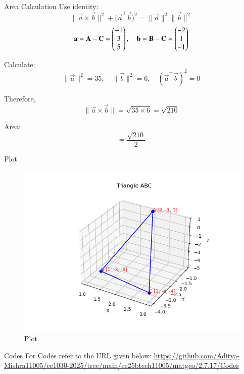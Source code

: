 \documentclass{beamer}
\begin{document}
\begin{frame}{Area Calculation}
Use identity:
\[
\| \vec{a} \times \vec{b} \|^2 + \big( \vec{a}^\top \vec{b} \big)^2 = \|\vec{a}\|^2 \|\vec{b}\|^2
\]
\[
\mathbf{a} = \mathbf{A} - \mathbf{C} = \begin{pmatrix}-1 \\ 3 \\ 5\end{pmatrix}, \quad \mathbf{b} = \mathbf{B} - \mathbf{C} = \begin{pmatrix}-2 \\ 1 \\ -1\end{pmatrix}
\]

Calculate:
\[
\|\vec{a}\|^2 = 35, \quad \|\vec{b}\|^2 = 6, \quad (\vec{a}^\top \vec{b})^2 = 0
\]

Therefore,
\[
\| \vec{a} \times \vec{b} \| = \sqrt{35 \times 6} = \sqrt{210}
\]

Area:
\[
= \frac{\sqrt{210}}{2}
\]
\end{frame}
\begin{frame}{Plot}
\begin{figure}
    \centering
    \includegraphics[width=0.8\columnwidth]{Figs/Figure_1.png}
    \caption{Plot}
    \label{fig:placeholder}
\end{figure}
\end{frame}
\begin{frame}{Codes}
	\centering
	For Codes refer to the URL given below:
	\url{https://github.com/Aditya-Mishra11005/ee1030-2025/tree/main/ee25btech11005/matgeo/2.7.17/Codes}
\end{frame}
\end{document}
